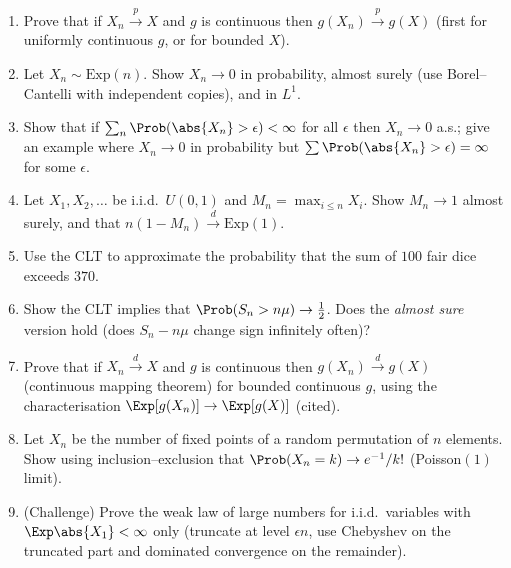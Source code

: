 \begin{enumerate}
\item Prove that if $X_n\xrightarrow{p}X$ and $g$ is continuous then
$g(X_n)\xrightarrow{p}g(X)$ (first for uniformly continuous $g$, or for bounded
$X$).
\item Let $X_n\sim\mathrm{Exp}(n)$. Show $X_n\to0$ in probability, almost surely (use
Borel--Cantelli with independent copies), and in $L^1$.
\item Show that if $\sum_n\Prob(\abs{X_n}>\epsilon)<\infty$ for all $\epsilon$ then
$X_n\to0$ a.s.; give an example where $X_n\to0$ in probability but
$\sum\Prob(\abs{X_n}>\epsilon)=\infty$ for some $\epsilon$.
\item Let $X_1,X_2,\dots$ be i.i.d.\ $U(0,1)$ and $M_n=\max_{i\le n}X_i$. Show
$M_n\to1$ almost surely, and that $n(1-M_n)\xrightarrow{d}\mathrm{Exp}(1)$.
\item Use the CLT to approximate the probability that the sum of $100$ fair dice
exceeds $370$.
\item Show the CLT implies that $\Prob(S_n>n\mu)\to\tfrac12$. Does the
\emph{almost sure} version hold (does $S_n-n\mu$ change sign infinitely often)?
\item Prove that if $X_n\xrightarrow{d}X$ and $g$ is continuous then
$g(X_n)\xrightarrow{d}g(X)$ (continuous mapping theorem) for bounded continuous $g$,
using the characterisation $\Exp[g(X_n)]\to\Exp[g(X)]$ (cited).
\item Let $X_n$ be the number of fixed points of a random permutation of $n$ elements.
Show using inclusion--exclusion that $\Prob(X_n=k)\to e^{-1}/k!$ (Poisson$(1)$ limit).
\item (Challenge) Prove the weak law of large numbers for i.i.d.\ variables with
$\Exp\abs{X_1}<\infty$ only (truncate at level $\epsilon n$, use Chebyshev on the
truncated part and dominated convergence on the remainder).
\end{enumerate}
